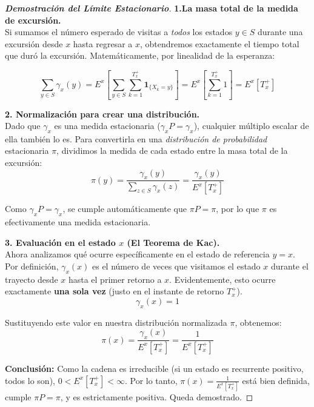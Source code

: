 \documentclass[10pt,a4paper]{article}
\begin{document}
\begin{proof}[\textbf{Demostración del Límite Estacionario}]
    \textbf{1.La masa total de la medida de excursión.} \\
    Si sumamos el número esperado de visitas a \textit{todos} 
    los estados $y \in S$ durante una excursión desde $x$ hasta regresar a $x$, 
    obtendremos exactamente el tiempo total que duró la excursión.
    Matemáticamente, por linealidad de la esperanza:

    \[ \sum_{y \in S} \gamma_x(y) = E^x \left[ \sum_{y \in S} \sum_{k=1}^{T_x^+} \mathbf{1}_{\{X_k = y\}} \right] = E^x \left[ \sum_{k=1}^{T_x^+} 1 \right] = E^x[T_x^+] \]
    
    \textbf{2. Normalización para crear una distribución.} \\
    Dado que $\gamma_x$ es una medida estacionaria ($\gamma_x P = \gamma_x$), 
    cualquier múltiplo escalar de ella también lo es. Para convertirla en 
    una \textit{distribución de probabilidad} estacionaria $\pi$, dividimos 
    la medida de cada estado entre la masa total de la excursión:
    \[ \pi(y) = \frac{\gamma_x(y)}{\sum_{z \in S} \gamma_x(z)} = \frac{\gamma_x(y)}{E^x[T_x^+]} \]
    
    Como $\gamma_x P = \gamma_x$, se cumple automáticamente que $\pi P = \pi$, por lo que $\pi$ es efectivamente una medida estacionaria.

    \textbf{3. Evaluación en el estado $x$ (El Teorema de Kac).} \\
    Ahora analizamos qué ocurre específicamente en el estado de referencia $y = x$. 
    Por definición, $\gamma_x(x)$ es el número de veces que visitamos el estado $x$ durante el trayecto desde $x$ hasta el primer retorno a $x$. Evidentemente, esto ocurre exactamente \textbf{una sola vez} (justo en el instante de retorno $T_x^+$).
    \[ \gamma_x(x) = 1 \]
    
    Sustituyendo este valor en nuestra distribución normalizada $\pi$, obtenemos:
    \[ \pi(x) = \frac{\gamma_x(x)}{E^x[T_x^+]} = \frac{1}{E^x[T_x^+]} \]
    
    \textbf{Conclusión:}
    Como la cadena es irreducible (si un estado es recurrente positivo, todos lo son), 
    $0 < E^x[T_x^+] < \infty$. Por lo tanto, $\pi(x) = \frac{1}{E^x[T_x^+]}$ 
    está bien definida, cumple $\pi P = \pi$, y es estrictamente positiva. Queda demostrado.
\end{proof}

\newpage

\vspace{5mm}
\end{document}
